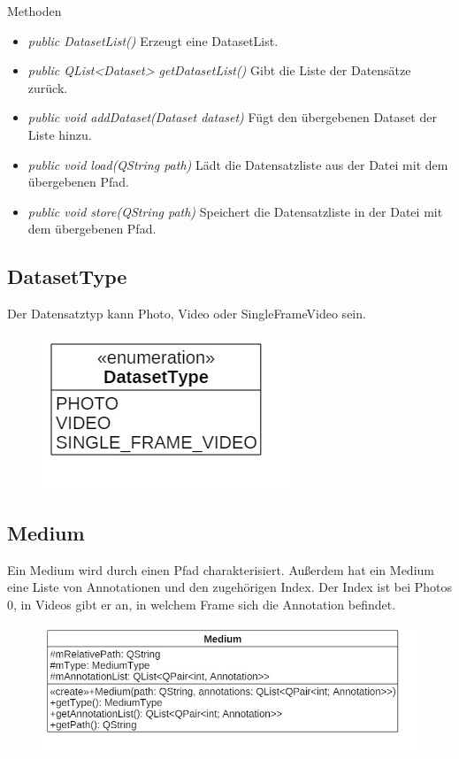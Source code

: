Methoden
\begin{itemize}
\item \textit{public DatasetList()} Erzeugt eine DatasetList.
\item \textit{public QList<Dataset> getDatasetList()} Gibt die Liste der Datensätze zurück.
\item \textit{public void addDataset(Dataset dataset)} Fügt den übergebenen Dataset der Liste hinzu.
\item \textit{public void load(QString path)} Lädt die Datensatzliste aus der Datei mit dem übergebenen Pfad.
\item \textit{public void store(QString path)} Speichert die Datensatzliste in der Datei mit dem übergebenen Pfad.
\end{itemize}

\subsection*{DatasetType}
Der Datensatztyp kann Photo, Video oder SingleFrameVideo sein.

\begin{figure}[H]
\centering
\includegraphics[scale=0.5]{img/Klassendiagramm/Klassen/DatasetType}
\label{fig:datasetType}
\end{figure}

\subsection*{Medium}
Ein Medium wird durch einen Pfad charakterisiert. Außerdem hat ein Medium eine Liste von Annotationen und den zugehörigen Index. Der Index ist bei Photos 0, in Videos gibt er an, in welchem Frame sich die Annotation befindet.

\begin{figure}[H]
\centering
\includegraphics[scale=0.5]{img/Klassendiagramm/Klassen/Medium}
\label{fig:medium}
\end{figure}

